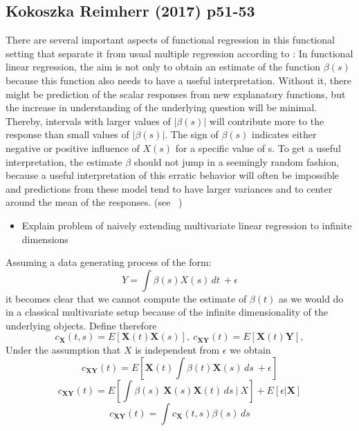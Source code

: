 \documentclass[11pt,twoside,a4paper]{article}
\begin{document}
\subsection{Kokoszka Reimherr (2017) p51-53}
There are several important aspects of functional regression in this functional setting that separate it from usual multiple regression according to \cite{kokoszka_introduction_2017}: In functional linear regression, the aim is not only to obtain an estimate of the function $\beta(s)$ because this function also needs to have a useful interpretation. Without it, there might be prediction of the scalar responses from new explanatory functions, but the increase in understanding of the underlying question will be minimal. Thereby, intervals with larger values of $|\beta(s)|$ will contribute more to the response than small values of  $|\beta(s)|$. The sign of $\beta(s)$ indicates either negative or positive influence of $X(s)$ for a specific value of s. To get a useful interpretation, the estimate $\beta$ should not jump in a seemingly random fashion, because a useful interpretation of this erratic behavior will often be impossible and predictions from these model tend to have larger variances and to center around the mean of the responses. (see ~\cite{kokoszka_introduction_2017})
	
	\begin{itemize}
		\item Explain problem of naively extending multivariate linear regression to infinite dimensions
	\end{itemize}
	Assuming a data generating process of the form:
	\begin{equation}
     Y =  \int \beta(s)X(s) \,dt \ +\epsilon
    \end{equation}
    it becomes clear that we cannot compute the estimate of $\beta(t)$ as we would do in a classical multivariate setup because of the infinite dimensionality of the underlying objects. Define therefore
    \begin{equation}
  	c_{\mathbf{X}}(t,s) = E[\mathbf{X}(t)\mathbf{X}(s)],\: c_{\mathbf{X}\mathbf{Y}}(t) = E[\mathbf{X}(t)\mathbf{Y}], 
    \end{equation}
   Under the assumption that $X$ is independent from $\epsilon$ we obtain
   \begin{equation}
     c_{\mathbf{X}\mathbf{Y}}(t) = E[\mathbf{X}(t)\int \beta(t)\mathbf{X}(s) \,ds \ +\epsilon]
   \end{equation}
    \begin{equation}
     c_{\mathbf{X}\mathbf{Y}}(t) = E[\int \beta(s) \: \mathbf{X}(s)\mathbf{X}(t) \, ds \: | \: X]  + E[\epsilon |\mathbf{X}]
  	\end{equation}
   	\begin{equation}
    	c_{\mathbf{X}\mathbf{Y}}(t) = \int c_{\mathbf{X}}(t,s) \beta(s) \,ds
   \end{equation}
   
\end{document}
